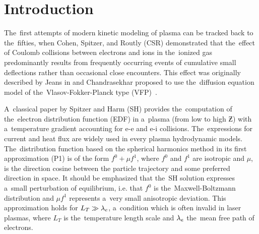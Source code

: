 \section{Introduction}
\label{sec:Intro}

The~first attempts of modern kinetic modeling of plasma can be tracked back 
to the~fifties, when Cohen, Spitzer, and Routly (CSR) \cite{CSR_1950} 
demonstrated that the~effect of Coulomb collisions between electrons and ions 
in the~ionized gas predominantly results 
from frequently occurring events of cumulative small deflections 
rather than occasional close encounters. This effect was originally described
by Jeans in \cite{Jeans_BOOK1929} and 
Chandrasekhar \cite{Chandrasekhar_RMP1943} 
proposed to use the~diffusion equation model of the~Vlasov-Fokker-Planck type 
(VFP)~\cite{Planck_1917}.

A~classical paper by Spitzer and Harm (SH) 
\cite{SpitzerHarm_PR1953} provides the~computation of 
the~electron distribution function (EDF) in a~plasma (from low to high $\Zbar$)
with a~temperature gradient accounting for e-e and e-i collisions.
The~expressions for current and heat flux are widely used in every plasma 
hydrodynamic models.
The~distribution function based on the spherical harmonics method in 
its first approximation (P1) \cite{Jeans_MNRAS1917} is of the form 
$f^0+\mu f^1$, where $f^0$ and $f^1$ 
are isotropic and $\mu$, is the direction cosine between the particle 
trajectory and some preferred direction in space. It should be emphasized that
the~SH solution expresses a~small perturbation of equilibrium, i.e. that 
$f^0$ is the~Maxwell-Boltzmann distribution and $\mu f^1$ represents 
a~very small anisotropic deviation. 
This approximation holds for $L_T\gg\lambda_e$, 
a~condition which is often invalid in laser plasmas, 
where $L_T$ is the~temperature length scale and $\lambda_e$ 
the~mean free path of electrons.%

